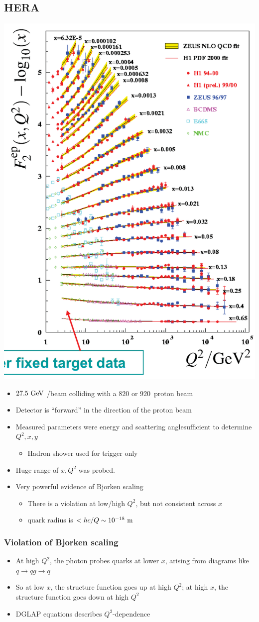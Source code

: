 \subsection{HERA}
  \begin{center}  \includegraphics[height=0.7\textwidth,angle=90]{figs/hera.png} \end{center}
\begin{itemize}
  \item $27.5~\text{GeV}$ \el/\pos beam colliding with a $820$ or $920$~\gev proton beam
  \item Detector is ``forward'' in the direction of the proton beam
  \item Measured parameters were \el energy and scattering angle\thus sufficient to determine $Q^2,x,y$
  \begin{itemize}
    \item Hadron shower used for trigger only
  \end{itemize}
  \item Huge range of $x,Q^2$ was probed. 
  \item Very powerful evidence of Bjorken scaling 
  \begin{itemize}
    \item There is a violation at low/high $Q^2$, but not consistent across $x$ 
    \item \thus quark radius is $< hc/Q \sim 10^{-18}~\text{m}$
  \end{itemize}
\end{itemize}

\subsubsection{Violation of Bjorken scaling}
\begin{itemize}
  \item At high $Q^2$, the photon probes quarks at lower $x$, arising from diagrams like $q\rightarrow qg\rightarrow q$
  \item So at low $x$, the structure function goes up at high $Q^2$; at high $x$, the structure function goes down at high $Q^2$
  \item DGLAP equations describes $Q^2$-dependence
\end{itemize}

